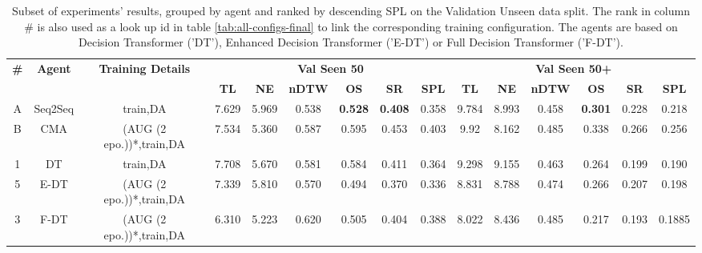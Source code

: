 \begin{table}
\centering
\caption{\label{tab:best_seen_50}Subset of experiments' results, grouped by agent and ranked by descending SPL on the Validation Unseen data split. The rank in column \# is also used as a look up id in table \ref{tab:all-configs-final} to link the corresponding training configuration.     \newline The agents are based on Decision Transformer ('DT'), Enhanced Decision Transformer ('E-DT') or Full Decision Transformer ('F-DT').}
\begin{tabular}{@{\hskip3pt}c@{\hskip3pt}c@{\hskip3pt}c@{\hskip3pt}c@{\hskip3pt}c@{\hskip3pt}c@{\hskip3pt}c@{\hskip3pt}c@{\hskip3pt}c@{\hskip3pt}c@{\hskip3pt}c@{\hskip3pt}c@{\hskip3pt}c@{\hskip3pt}c@{\hskip3pt}c}
\toprule
\textbf{\#} & \textbf{Agent} & \textbf{Training Details} & \multicolumn{6}{c}{\textbf{Val Seen 50}} & \multicolumn{6}{c}{\textbf{Val Seen 50+}} \\
 \textbf{~} &     \textbf{~} &                \textbf{~} &       \textbf{TL} &    \textbf{NE} &   \textbf{nDTW} &     \textbf{OS} &    \textbf{SR} &    \textbf{SPL} &         \textbf{TL} &     \textbf{NE} &   \textbf{nDTW} &     \textbf{OS} &    \textbf{SR} &    \textbf{SPL} \\
          A &             Seq2Seq &                  train,DA &             7.629 &          5.969 &           0.538 &  \textbf{ 0.528} &  \textbf{ 0.408} &           0.358 &                9.784 &           8.993 &           0.458 &  \textbf{0.301} &  0.228 &  0.218 \\
          B &           CMA &  (AUG (2 epo.))*,train,DA &             7.534 &          5.360 &           0.587 &           0.595 &          0.453 &           0.403 &               9.92 &           8.162 &           0.485 &           0.338 &          0.266 &           0.256 \\
\midrule
          1 &             DT &                  train,DA &             7.708&          5.670 &           0.581 &   0.584 &  0.411 &           0.364 &                9.298 &     9.155      &    0.463       &  0.264 & 0.199  &  0.190 \\
          5 &           E-DT &  (AUG (2 epo.))*,train,DA &             7.339 &          5.810 &           0.570 &           0.494 &       0.370    &       0.336     &              8.831 &           8.788 &           0.474 &           0.266 &          0.207 &           0.198 \\
          3 &           F-DT &  (AUG (2 epo.))*,train,DA &              6.310 &  5.223 &  0.620 &        0.505    &        0.404   &    0.388 &               8.022 &  8.436 &  0.485 &       0.217      &          0.193 &           0.1885 \\
\bottomrule
\end{tabular}
\end{table}
